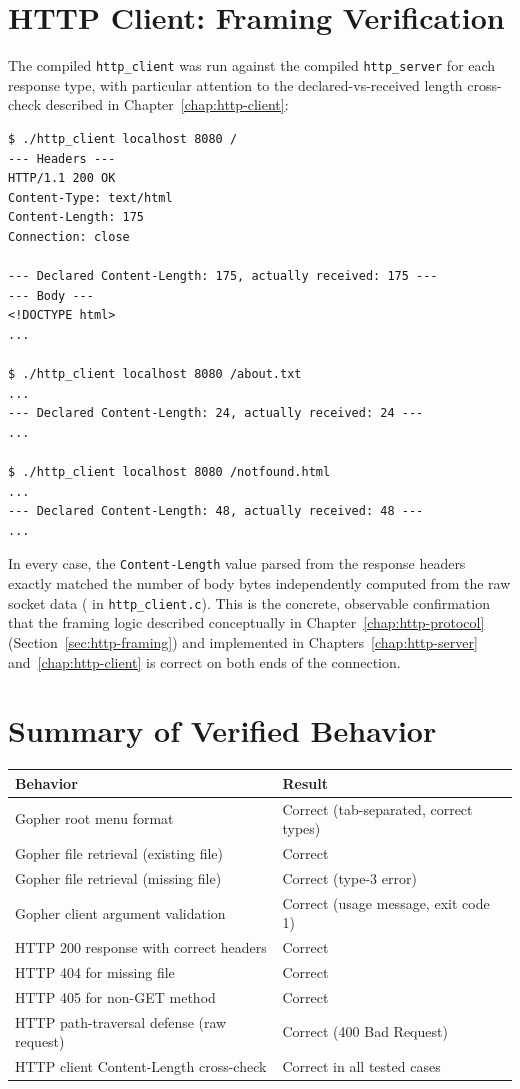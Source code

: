 \section{HTTP Client: Framing Verification}

The compiled \texttt{http\_client} was run against the compiled \texttt{http\_server} for each response type, with particular attention to the declared-vs-received length cross-check described in Chapter~\ref{chap:http-client}:

\begin{lstlisting}[style=bashstyle, numbers=none]
$ ./http_client localhost 8080 /
--- Headers ---
HTTP/1.1 200 OK
Content-Type: text/html
Content-Length: 175
Connection: close

--- Declared Content-Length: 175, actually received: 175 ---
--- Body ---
<!DOCTYPE html>
...

$ ./http_client localhost 8080 /about.txt
...
--- Declared Content-Length: 24, actually received: 24 ---
...

$ ./http_client localhost 8080 /notfound.html
...
--- Declared Content-Length: 48, actually received: 48 ---
...
\end{lstlisting}

In every case, the \texttt{Content-Length} value parsed from the response headers exactly matched the number of body bytes independently computed from the raw socket data ( in \texttt{http\_client.c}). This is the concrete, observable confirmation that the framing logic described conceptually in Chapter~\ref{chap:http-protocol} (Section~\ref{sec:http-framing}) and implemented in Chapters~\ref{chap:http-server} and~\ref{chap:http-client} is correct on both ends of the connection.

\section{Summary of Verified Behavior}

\begin{center}
\begin{tabularx}{\textwidth}{X l}
\toprule
\textbf{Behavior} & \textbf{Result} \\
\midrule
Gopher root menu format & Correct (tab-separated, correct types) \\
Gopher file retrieval (existing file) & Correct \\
Gopher file retrieval (missing file) & Correct (type-3 error) \\
Gopher client argument validation & Correct (usage message, exit code 1) \\
HTTP 200 response with correct headers & Correct \\
HTTP 404 for missing file & Correct \\
HTTP 405 for non-GET method & Correct \\
HTTP path-traversal defense (raw request) & Correct (400 Bad Request) \\
HTTP client Content-Length cross-check & Correct in all tested cases \\
\bottomrule
\end{tabularx}
\end{center}
